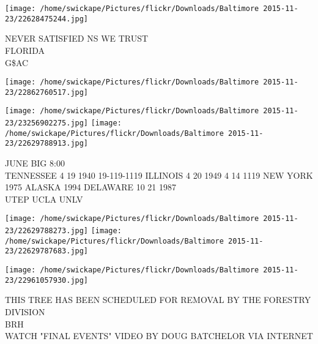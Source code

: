 \documentclass[10pt,letterpaper]{article}
\begin{document}
\texttt{[image: /home/swickape/Pictures/flickr/Downloads/Baltimore 2015-11-23/22628475244.jpg]}

NEVER SATISFIED NS WE TRUST\\
FLORIDA\\
G\$AC\\
\pagebreak

\texttt{[image: /home/swickape/Pictures/flickr/Downloads/Baltimore 2015-11-23/22862760517.jpg]}

\vspace{0.25in}
\texttt{[image: /home/swickape/Pictures/flickr/Downloads/Baltimore 2015-11-23/23256902275.jpg]}
\texttt{[image: /home/swickape/Pictures/flickr/Downloads/Baltimore 2015-11-23/22629788913.jpg]}

JUNE BIG 8:00\\
TENNESSEE 4 19 1940 19{-}119{-}1119 ILLINOIS 4 20 1949 4 14 1119 NEW YORK 1975 ALASKA 1994 DELAWARE 10 21 1987\\
UTEP UCLA UNLV\\
\pagebreak

\texttt{[image: /home/swickape/Pictures/flickr/Downloads/Baltimore 2015-11-23/22629788273.jpg]}
\texttt{[image: /home/swickape/Pictures/flickr/Downloads/Baltimore 2015-11-23/22629787683.jpg]}

\texttt{[image: /home/swickape/Pictures/flickr/Downloads/Baltimore 2015-11-23/22961057930.jpg]}

THIS TREE HAS BEEN SCHEDULED FOR REMOVAL BY THE FORESTRY DIVISION\\
BRH\\
WATCH "FINAL EVENTS" VIDEO BY DOUG BATCHELOR VIA INTERNET\\
\pagebreak
\end{document}
